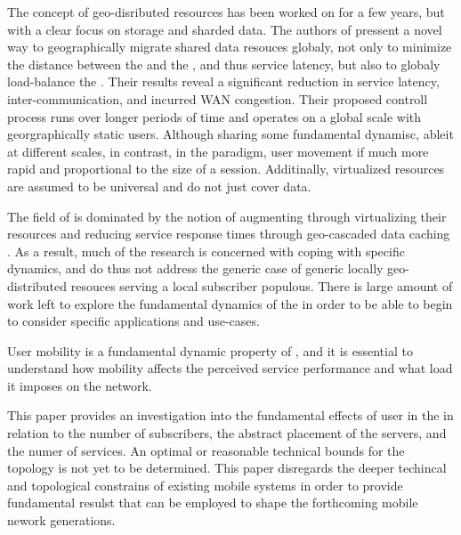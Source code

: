 The concept of geo-disributed resources has been worked on for a few years, but with a clear focus on storage and sharded data. The authors of \cite{agarwal2010volley} pressent a novel way to geographically migrate shared data resouces globaly, not only to minimize the distance between the \ue and the \dc, and thus service latency, but also to globaly load-balance the \dcs. Their results reveal a significant reduction in service latency, inter-\dc communication, and incurred WAN congestion. Their proposed controll process runs over longer periods of time and operates on a global scale with georgraphically static users. Although sharing some fundamental dynamisc, ableit at different scales, in contrast, in the \xcloud paradigm, user movement if much more rapid and proportional to the size of a session. Additinally, \xcloud virtualized resources are assumed to be universal and do not just cover data.

The field of \xcloud is dominated by the notion of augmenting \ues through virtualizing their resources \cite{6563280} and reducing service response times through geo-cascaded data caching \cite{1437087,ericsson_akami}. As a result, much of the research is concerned with coping with specific dynamics, and do thus not address the generic case of generic locally geo-distributed resouces serving a local subscriber populous. There is large amount of work left to explore the fundamental dynamics of the \xcloud in order to be able to begin to consider specific applications and use-cases.

User mobility is a fundamental dynamic property of \xcloud, and it is essential to understand how \ue mobility affects the perceived service performance and what load it imposes on the network.

This paper provides an investigation into the fundamental effects of user \ue in the \xcloud in relation to the number of subscribers, the abstract placement of the servers, and the numer of services. An optimal or reasonable technical bounds for the \xcloud topology is not yet to be determined. This paper disregards the deeper techincal and topological constrains of existing mobile systems in order to provide fundamental resulst that can be employed to shape the forthcoming mobile nework generations.

